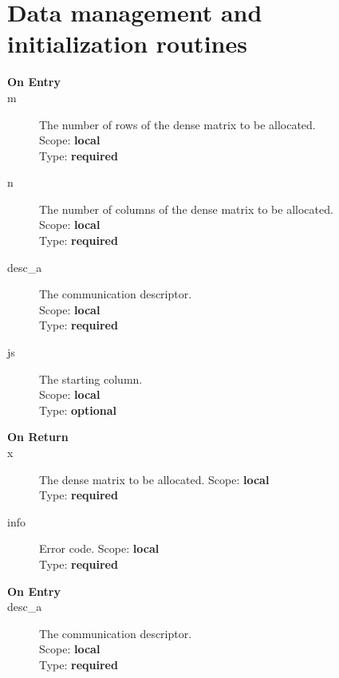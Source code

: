 \section{Data management and initialization routines}
%
%


\begin{description}
\item[\bf On Entry]
\item[m] The number of rows of the dense matrix to be allocated.\\
Scope: {\bf local} \\
Type: {\bf required}\\
\item[n] The number of columns of the dense matrix to be allocated.\\
Scope: {\bf local} \\
Type: {\bf required}\\
\item[desc\_a] The communication descriptor.\\
Scope: {\bf local} \\
Type: {\bf required}\\
\item[js] The starting column.\\
Scope: {\bf local} \\
Type: {\bf optional}\\
\end{description}

\begin{description}
\item[\bf On Return]
\item[x] The dense matrix to be allocated.
Scope: {\bf local} \\
Type: {\bf required}\\
\item[info] Error code.
Scope: {\bf local} \\
Type: {\bf required}\\
\end{description}

%
%


\begin{description}
\item[\bf On Entry]
\item[desc\_a] The communication descriptor.\\
Scope: {\bf local} \\
Type: {\bf required}\\
\end{description}

